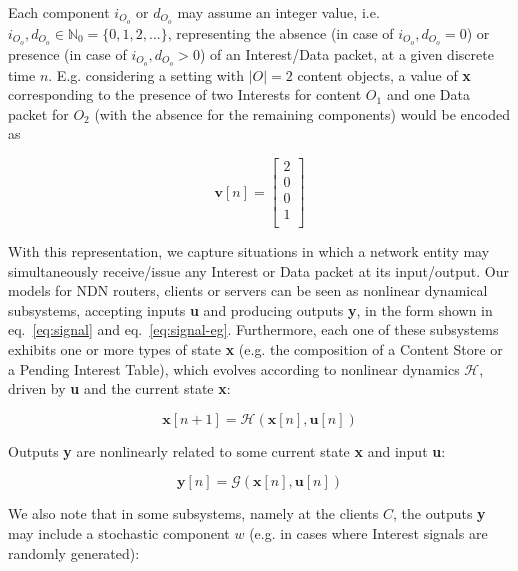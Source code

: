 Each component $i_{O_o}$ or $d_{O_o}$ may assume an integer value, i.e. $i_{O_o}, d_{O_o} \in \mathbb{N}_0 = \{0, 1, 2, ... \}$, 
representing the absence (in case of $i_{O_o}, d_{O_o} = 0$) or presence (in case of $i_{O_o}, d_{O_o} > 0$) of an 
Interest\slash Data packet, at a given discrete time $n$. E.g. considering a setting 
with $|O| = 2$ content objects, a value of \textbf{x} corresponding to the presence 
of two Interests for content $O_1$ and one Data packet for $O_2$ (with the absence 
for the remaining components) would be encoded as

\begin{equation}
    \textbf{v}[n] = \begin{bmatrix}     2   \\ 
                                        0   \\ 
                                        0   \\ 
                                        1   \\ \end{bmatrix}
    \label{eq:signal-eg}
\end{equation}\shortvertbreak

With this 
representation, we capture situations in which a network 
entity may simultaneously receive\slash issue any Interest or Data packet at 
its input\slash output. Our models for NDN routers, clients or servers can be 
seen as nonlinear dynamical subsystems, accepting inputs \textbf{u} and producing 
outputs \textbf{y}, in the form shown in eq.~\ref{eq:signal} 
and eq.~\ref{eq:signal-eg}. Furthermore, each one of these subsystems exhibits one or 
more types of state \textbf{x} (e.g. the composition of a Content Store or a Pending 
Interest Table), which evolves according to nonlinear dynamics $\mathcal{H}$, 
driven by \textbf{u} and the current state \textbf{x}:

\begin{equation}
    \textbf{x}[n + 1] = \mathcal{H}(\textbf{x}[n],\textbf{u}[n])
    \label{eq:state}
\end{equation}%

Outputs \textbf{y} are nonlinearly related to some current state \textbf{x} and input \textbf{u}:

\begin{equation}
    \textbf{y}[n] = \mathcal{G}(\textbf{x}[n],\textbf{u}[n])
    \label{eq:outputs}
\end{equation}%

We also note that in some subsystems, namely at the clients $C$, the outputs 
\textbf{y} may include a stochastic component $w$ (e.g. in cases where Interest 
signals are randomly generated):

